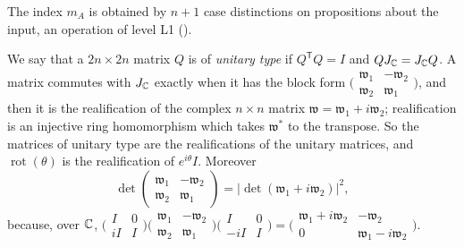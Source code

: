 The index $m_A$ is obtained by $n+1$ case distinctions on propositions about the input, an operation of level L1
().

We say that a $2n\times2n$ matrix $Q$ is of \emph{unitary type} if $Q^{\mathsf T}Q=I$ and $QJ_{\mathbb{C}}=J_{\mathbb{C}} Q$. A matrix
commutes with $J_{\mathbb{C}}$ exactly when it has the block form $\bigl(\begin{smallmatrix}\mathfrak w_1&-\mathfrak w_2\\
\mathfrak w_2&\mathfrak w_1\end{smallmatrix}\bigr)$, and then it is the realification of the complex $n\times n$ matrix
$\mathfrak w=\mathfrak w_1+i\mathfrak w_2$; realification is an injective ring homomorphism which takes $\mathfrak w^*$ to the
transpose. So the matrices of unitary type are the realifications of the unitary matrices, and $\operatorname{rot}(\theta)$ is
the realification of $e^{i\theta}I$. Moreover
\begin{equation}\label{eq:iso-realdet}
 \det\begin{pmatrix}\mathfrak w_1&-\mathfrak w_2\\\mathfrak w_2&\mathfrak w_1\end{pmatrix}=\big|\det(\mathfrak w_1+i\mathfrak w_2)\big|^2 ,
\end{equation}
because, over $\mathbb{C}$,
$\bigl(\begin{smallmatrix}I&0\\iI&I\end{smallmatrix}\bigr)\bigl(\begin{smallmatrix}\mathfrak w_1&-\mathfrak w_2\\\mathfrak w_2&\mathfrak w_1\end{smallmatrix}\bigr)
\bigl(\begin{smallmatrix}I&0\\-iI&I\end{smallmatrix}\bigr)=\bigl(\begin{smallmatrix}\mathfrak w_1+i\mathfrak w_2&-\mathfrak w_2\\0&\mathfrak w_1-i\mathfrak w_2\end{smallmatrix}\bigr)$.

